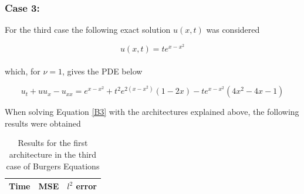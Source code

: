 \documentclass[12pt,letterpaper]{article}
\begin{document}
  \subsubsection*{Case 3:}

  For the third case the following exact solution $u(x,t)$ was considered
  
  $$u(x,t) = t e^{x-x^2}$$\\
  
  which, for $\nu=1$, gives the PDE below
  
  \begin{equation}
    \label{B3}
    u_t + u u_x - u_{xx} = e^{x-x^2} + t^2 e^{2(x-x^2)}(1-2x) - t e^{x-x^2}(4x^2 - 4x - 1)
  \end{equation}
  
  When solving Equation \ref{B3} with the architectures explained above, the following results were obtained
  
  \begin{table}[H]
    \begin{center}
    \begin{tabular}{ r | c  c }
    \textbf{Time} & \textbf{MSE} & \textbf{$l^2$ error} \\ \hline

    \end{tabular}
    \caption{Results for the first architecture in the third case of Burgers Equations}
    \label{tab:B31}
    \end{center}
    \end{table}
  
\end{document}
